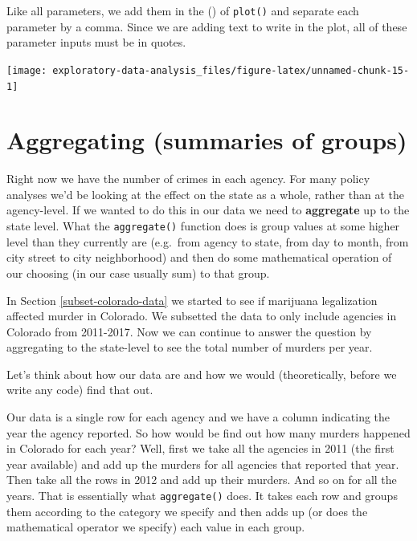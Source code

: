 \documentclass[
  12pt,
]{book}
\newenvironment{Shaded}{\begin{snugshade}}{\end{snugshade}}
\newcommand{\DataTypeTok}[1]{\textcolor[rgb]{0.13,0.29,0.53}{#1}}
\newcommand{\KeywordTok}[1]{\textcolor[rgb]{0.13,0.29,0.53}{\textbf{#1}}}
\newcommand{\NormalTok}[1]{#1}
\newcommand{\OperatorTok}[1]{\textcolor[rgb]{0.81,0.36,0.00}{\textbf{#1}}}
\newcommand{\StringTok}[1]{\textcolor[rgb]{0.31,0.60,0.02}{#1}}
\begin{document}
Like all parameters, we add them in the () of \texttt{plot()} and separate each parameter by a comma. Since we are adding text to write in the plot, all of these parameter inputs must be in quotes.

\begin{Shaded}
\end{Shaded}

\begin{center}\texttt{[image: exploratory-data-analysis\_files/figure-latex/unnamed-chunk-15-1]} \end{center}

\hypertarget{aggregate}{%
\section{Aggregating (summaries of groups)}\label{aggregate}}

Right now we have the number of crimes in each agency. For many policy analyses we'd be looking at the effect on the state as a whole, rather than at the agency-level. If we wanted to do this in our data we need to \textbf{aggregate} up to the state level. What the \texttt{aggregate()} function does is group values at some higher level than they currently are (e.g.~from agency to state, from day to month, from city street to city neighborhood) and then do some mathematical operation of our choosing (in our case usually sum) to that group.

In Section \ref{subset-colorado-data} we started to see if marijuana legalization affected murder in Colorado. We subsetted the data to only include agencies in Colorado from 2011-2017. Now we can continue to answer the question by aggregating to the state-level to see the total number of murders per year.

Let's think about how our data are and how we would (theoretically, before we write any code) find that out.

Our data is a single row for each agency and we have a column indicating the year the agency reported. So how would be find out how many murders happened in Colorado for each year? Well, first we take all the agencies in 2011 (the first year available) and add up the murders for all agencies that reported that year. Then take all the rows in 2012 and add up their murders. And so on for all the years. That is essentially what \texttt{aggregate()} does. It takes each row and groups them according to the category we specify and then adds up (or does the mathematical operator we specify) each value in each group.
\end{document}
